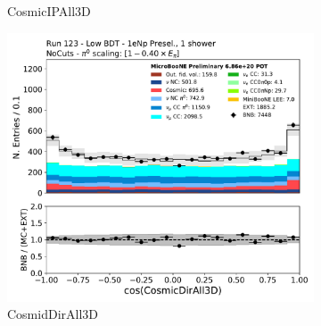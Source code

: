 \begin{figure}[H]
\begin{subfigure}{0.3\textwidth}
    \caption{CosmicIPAll3D}
    \end{subfigure}
    \begin{subfigure}{0.3\textwidth}
    \includegraphics[width=1.0\textwidth]{Sidebands/Figures/1eNp/LPID_NPOneShr_None_pi0e40/CosmicDirAll3D.pdf}
    \caption{CosmidDirAll3D}
    \end{subfigure}
    \caption{} 
    \label{fig:LPID_1eNp_5}
\end{figure}


